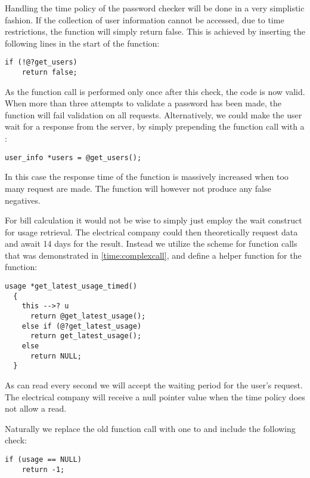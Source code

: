 Handling the time policy of the password checker will be done in a very simplistic fashion.
If the collection of user information cannot be accessed, due to time restrictions, the function will simply return false.
This is achieved by inserting the following lines in the start of the function:

\begin{lstlisting}[style=dlmc]
  if (!@?get_users)
    return false;
\end{lstlisting}

As the  function call is performed only once after this check, the code is now valid.
When more than three attempts to validate a password has been made, the function will fail validation on all requests.
Alternatively, we could make the user wait for a response from the server, by simply prepending the  function call with a :

\begin{lstlisting}[style=dlmc]
  user_info *users = @get_users();
\end{lstlisting}

In this case the response time of the function is massively increased when too many request are made.
The function will however not produce any false negatives.

For bill calculation it would not be wise to simply just employ the  wait construct for usage retrieval.
The electrical company could then theoretically request data and await 14 days for the result.
Instead we utilize the scheme for function calls that was demonstrated in \cref{time:complexcall}, and define a helper function for the  function:

\begin{lstlisting}[style=dlmc]
  usage *get_latest_usage_timed()
  {
    this -->? u
      return @get_latest_usage();
    else if (@?get_latest_usage)
      return get_latest_usage();
    else
      return NULL;
  }
\end{lstlisting}

As  can read every second we will accept the waiting period for the user's request.
The electrical company will receive a null pointer value when the time policy does not allow a read.

Naturally we replace the old  function call with one to  and include the following check:
\begin{lstlisting}[style=dlmc]
  if (usage == NULL)
    return -1;
\end{lstlisting}

